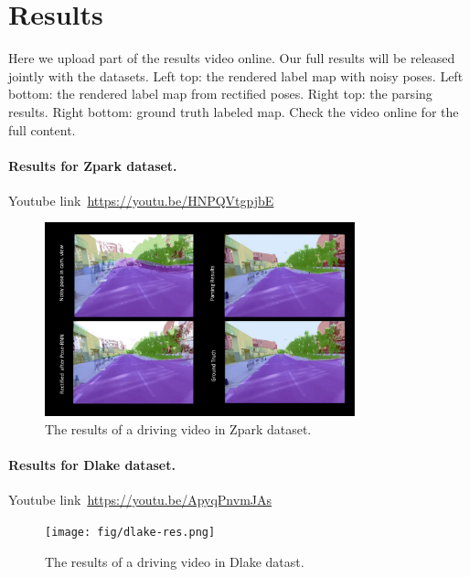 \documentclass[10pt,twocolumn,letterpaper]{article}
\begin{document}
\section{Results} 
Here we upload part of the results video online. Our full results will be released jointly with the datasets. Left top: the rendered label map with noisy poses. Left bottom: the rendered label map from rectified poses. Right top: the parsing results. Right bottom: ground truth labeled map. Check the video online for the full content.

\paragraph{Results for Zpark dataset.} Youtube link~\url{https://youtu.be/HNPQVtgpjbE}
\begin{figure}[!hbpt]
\center
\includegraphics[width=0.8\textwidth]{fig/results_video.pdf}
\caption{The results of a driving video in Zpark dataset. }
\label{fig:framework}
\end{figure}

\paragraph{Results for Dlake dataset.} Youtube link~\url{https://youtu.be/ApyqPnvmJAs}
\begin{figure}[!hbpt]
\center
\texttt{[image: fig/dlake-res.png]}
\caption{The results of a driving video in Dlake datast.}
\label{fig:framework}
\end{figure}

% 
% 
\end{document}
